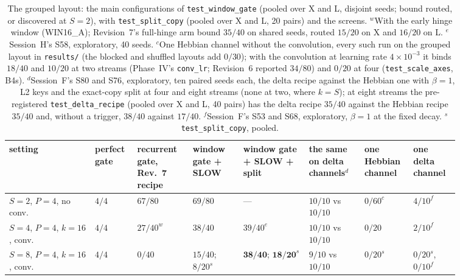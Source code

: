 \documentclass[11pt]{article}
\newcommand{\arm}[1]{\textsf{#1}}
\begin{document}
\begin{table}[H]
\centering
\footnotesize
\setlength{\tabcolsep}{2.5pt}
\begin{tabular}{@{}>{\raggedright\arraybackslash}p{0.17\linewidth}>{\centering\arraybackslash}p{0.07\linewidth}>{\centering\arraybackslash}p{0.11\linewidth}>{\centering\arraybackslash}p{0.1\linewidth}>{\centering\arraybackslash}p{0.13\linewidth}>{\centering\arraybackslash}p{0.11\linewidth}>{\centering\arraybackslash}p{0.08\linewidth}>{\centering\arraybackslash}p{0.09\linewidth}@{}}
\toprule
setting & perfect gate & recurrent gate, Rev.~7 recipe & window gate + SLOW & window gate + SLOW + split & the same on delta channels$^{d}$ & one Hebbian channel & one delta channel\\
\midrule
$S{=}2$, $P{=}4$, no conv. & $4/4$ & $67/80$ & $69/80$ & --- & $10/10$ vs $10/10$ & $0/60^{c}$ & $4/10^{f}$\\
$S{=}4$, $P{=}4$, $k{=}16$, conv. & $4/4$ & $27/40^{w}$ & $38/40$ & $39/40^{e}$ & $10/10$ vs $10/10$ & $0/20$ & $2/10^{f}$\\
$S{=}8$, $P{=}4$, $k{=}16$, conv. & $4/4$ & $0/40$ & $15/40$; $8/20^{s}$ & $\mathbf{38/40}$; $\mathbf{18/20}^{s}$ & $9/10$ vs $10/10$ & $0/20^{s}$ & $0/20^{s}$, $0/10^{f}$\\
\bottomrule
\end{tabular}
\caption{The grouped layout: the main configurations of \texttt{test\_window\_gate} (pooled over X and L, disjoint seeds; bound routed, or discovered at $S = 2$), with \texttt{test\_split\_copy} (pooled over X and L, 20 pairs) and the screens. $^{w}$With the early hinge window (\arm{WIN16\_A}); Revision~7's full-hinge arm bound $35/40$ on shared seeds, routed $15/20$ on X and $16/20$ on L. $^{e}$Session~H's S58, exploratory, 40 seeds. $^{c}$One Hebbian channel without the convolution, every such run on the grouped layout in \texttt{results/} (the blocked and shuffled layouts add $0/30$); with the convolution at learning rate $4\times10^{-3}$ it binds $18/40$ and $10/20$ at two streams (Phase~IV's \texttt{conv\_lr}; Revision~6 reported $34/80$) and $0/20$ at four (\texttt{test\_scale\_axes}, B4s). $^{d}$Session~F's S80 and S76, exploratory, ten paired seeds each, the delta recipe against the Hebbian one with $\beta = 1$, L2 keys and the exact-copy split at four and eight streams (none at two, where $k = S$); at eight streams the pre-registered \texttt{test\_delta\_recipe} (pooled over X and L, 40 pairs) has the delta recipe $35/40$ against the Hebbian recipe $35/40$ and, without a trigger, $38/40$ against $17/40$. $^{f}$Session~F's S53 and S68, exploratory, $\beta = 1$ at the fixed decay. $^{s}$\texttt{test\_split\_copy}, pooled.}
\label{tab:synthesis}
\end{table}
\end{document}
